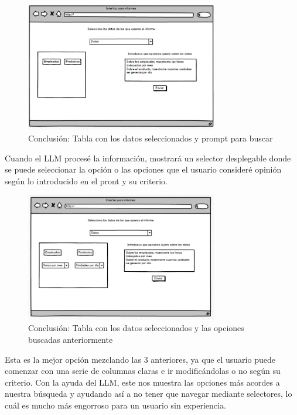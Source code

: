 \begin{figure}[hp!]
    \centering
    \includegraphics[width=0.75\textwidth]{imaxes/iteracion1.7.png}
    \caption{Conclusión: Tabla con los datos seleccionados y prompt para buscar}
    \label{fig:iteracion1.7}
\end{figure}

Cuando el LLM procesé la información, mostrará un selector desplegable donde se puede seleccionar la opción o las opciones que el usuario consideré opinión según lo introducido en el pront y su criterio.

\begin{figure}[hp!]
    \centering
    \includegraphics[width=0.75\textwidth]{imaxes/iteracion1.8.png}
    \caption{Conclusión: Tabla con los datos seleccionados y las opciones buscadas anteriormente}
    \label{fig:iteracion1.8}
\end{figure}
  
Esta es la mejor opción mezclando las 3 anteriores, ya que el usuario puede comenzar con una serie de columnas claras e ir modificándolas o no según su criterio. Con la ayuda del LLM, este nos muestra las opciones más acordes a nuestra búsqueda y ayudando así a no tener que navegar mediante selectores, lo cuál es mucho más engorroso para un usuario sin experiencia.
  
